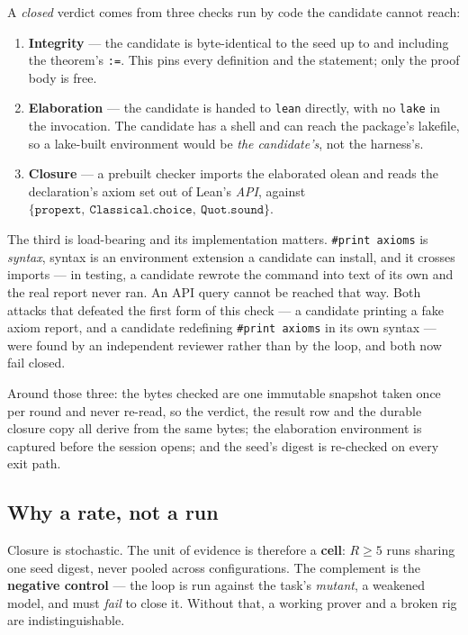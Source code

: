 \documentclass[11pt,a4paper]{article}
\begin{document}
A \emph{closed} verdict comes from three checks run by code the candidate cannot reach:

\begin{enumerate}
\item \textbf{Integrity} --- the candidate is byte-identical to the seed up to and including the
      theorem's \texttt{:=}. This pins every definition and the statement; only the proof body is free.
\item \textbf{Elaboration} --- the candidate is handed to \texttt{lean} directly, with no \texttt{lake}
      in the invocation. The candidate has a shell and can reach the package's lakefile, so a
      lake-built environment would be \emph{the candidate's}, not the harness's.
\item \textbf{Closure} --- a prebuilt checker imports the elaborated olean and reads the declaration's
      axiom set out of Lean's \emph{API}, against
      $\{\texttt{propext},\ \texttt{Classical.choice},\ \texttt{Quot.sound}\}$.
\end{enumerate}

The third is load-bearing and its implementation matters. \texttt{\#print axioms} is \emph{syntax},
syntax is an environment extension a candidate can install, and it crosses imports --- in testing, a
candidate rewrote the command into text of its own and the real report never ran. An API query cannot
be reached that way. Both attacks that defeated the first form of this check --- a candidate printing a
fake axiom report, and a candidate redefining \texttt{\#print axioms} in its own syntax --- were found
by an independent reviewer rather than by the loop, and both now fail closed.

Around those three: the bytes checked are one immutable snapshot taken once per round and never
re-read, so the verdict, the result row and the durable closure copy all derive from the same bytes;
the elaboration environment is captured before the session opens; and the seed's digest is re-checked
on every exit path.

\subsection{Why a rate, not a run}

Closure is stochastic. The unit of evidence is therefore a \textbf{cell}: $R \ge 5$ runs sharing one
seed digest, never pooled across configurations. The complement is the \textbf{negative control} ---
the loop is run against the task's \emph{mutant}, a weakened model, and must \emph{fail} to close it.
Without that, a working prover and a broken rig are indistinguishable.
\end{document}
